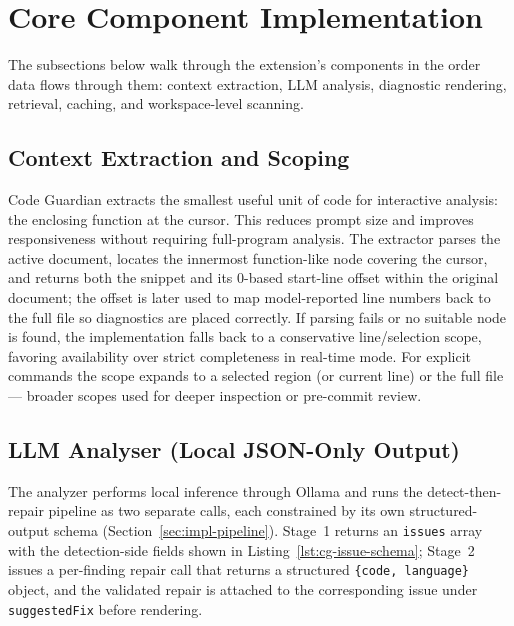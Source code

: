 \section{Core Component Implementation}
\label{sec:impl-components}

The subsections below walk through the extension's components in the order data flows through them: context extraction, LLM analysis, diagnostic rendering, retrieval, caching, and workspace-level scanning.

\subsection{Context Extraction and Scoping}
\label{subsec:impl-context}

Code Guardian extracts the smallest useful unit of code for interactive analysis: the enclosing function at the cursor. This reduces prompt size and improves responsiveness without requiring full-program analysis. The extractor parses the active document, locates the innermost function-like node covering the cursor, and returns both the snippet and its 0-based start-line offset within the original document; the offset is later used to map model-reported line numbers back to the full file so diagnostics are placed correctly. If parsing fails or no suitable node is found, the implementation falls back to a conservative line/selection scope, favoring availability over strict completeness in real-time mode. For explicit commands the scope expands to a selected region (or current line) or the full file --- broader scopes used for deeper inspection or pre-commit review.

\subsection{LLM Analyser (Local JSON-Only Output)}
\label{subsec:impl-analyzer}

The analyzer performs local inference through Ollama and runs the detect-then-repair pipeline as two separate calls, each constrained by its own structured-output schema (Section~\ref{sec:impl-pipeline}). Stage~1 returns an \texttt{issues} array with the detection-side fields shown in Listing~\ref{lst:cg-issue-schema}; Stage~2 issues a per-finding repair call that returns a structured \texttt{\{code, language\}} object, and the validated repair is attached to the corresponding issue under \texttt{suggestedFix} before rendering.

